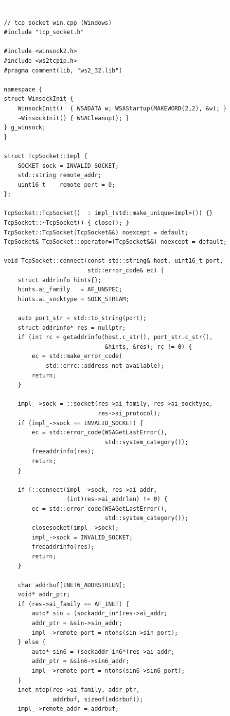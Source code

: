 \documentclass[12pt,a4paper,fontset=fandol]{ctexbook}
\newcommand{\pimplabel}{%
  \noindent\begin{tcolorbox}[sharp corners,colback=pimplheadbg,colframe=pimplheadbg,
    left=6pt,right=6pt,top=2pt,bottom=2pt,boxrule=0pt]
  \textcolor{white}{\small\bfseries\sffamily pImpl}\end{tcolorbox}%
}
\begin{document}
\pimplabel
\begin{lstlisting}
// tcp_socket_win.cpp (Windows)
#include "tcp_socket.h"

#include <winsock2.h>
#include <ws2tcpip.h>
#pragma comment(lib, "ws2_32.lib")

namespace {
struct WinsockInit {
    WinsockInit()  { WSADATA w; WSAStartup(MAKEWORD(2,2), &w); }
    ~WinsockInit() { WSACleanup(); }
} g_winsock;
}

struct TcpSocket::Impl {
    SOCKET sock = INVALID_SOCKET;
    std::string remote_addr;
    uint16_t    remote_port = 0;
};

TcpSocket::TcpSocket()  : impl_(std::make_unique<Impl>()) {}
TcpSocket::~TcpSocket() { close(); }
TcpSocket::TcpSocket(TcpSocket&&) noexcept = default;
TcpSocket& TcpSocket::operator=(TcpSocket&&) noexcept = default;

void TcpSocket::connect(const std::string& host, uint16_t port,
                        std::error_code& ec) {
    struct addrinfo hints{};
    hints.ai_family   = AF_UNSPEC;
    hints.ai_socktype = SOCK_STREAM;

    auto port_str = std::to_string(port);
    struct addrinfo* res = nullptr;
    if (int rc = getaddrinfo(host.c_str(), port_str.c_str(),
                             &hints, &res); rc != 0) {
        ec = std::make_error_code(
            std::errc::address_not_available);
        return;
    }

    impl_->sock = ::socket(res->ai_family, res->ai_socktype,
                           res->ai_protocol);
    if (impl_->sock == INVALID_SOCKET) {
        ec = std::error_code(WSAGetLastError(),
                             std::system_category());
        freeaddrinfo(res);
        return;
    }

    if (::connect(impl_->sock, res->ai_addr,
                  (int)res->ai_addrlen) != 0) {
        ec = std::error_code(WSAGetLastError(),
                             std::system_category());
        closesocket(impl_->sock);
        impl_->sock = INVALID_SOCKET;
        freeaddrinfo(res);
        return;
    }

    char addrbuf[INET6_ADDRSTRLEN];
    void* addr_ptr;
    if (res->ai_family == AF_INET) {
        auto* sin = (sockaddr_in*)res->ai_addr;
        addr_ptr = &sin->sin_addr;
        impl_->remote_port = ntohs(sin->sin_port);
    } else {
        auto* sin6 = (sockaddr_in6*)res->ai_addr;
        addr_ptr = &sin6->sin6_addr;
        impl_->remote_port = ntohs(sin6->sin6_port);
    }
    inet_ntop(res->ai_family, addr_ptr,
              addrbuf, sizeof(addrbuf));
    impl_->remote_addr = addrbuf;


\end{lstlisting}
\end{document}
